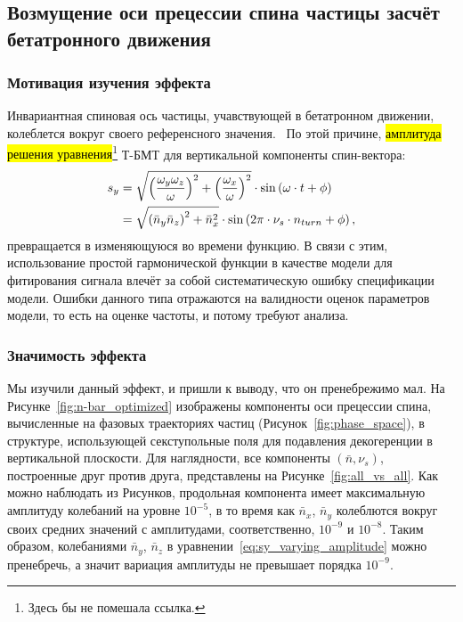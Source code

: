 \subsection{Возмущение оси прецессии спина частицы засчёт бетатронного движения}
\subsubsection{Мотивация изучения эффекта}
Инвариантная спиновая ось частицы, учавствующей в бетатронном движении, колеблется вокруг своего референсного значения.~\cite[стр.~11]{Shatunov} По этой причине, \hl{амплитуда решения уравнения}\footnote{Здесь бы не помешала ссылка.} Т-БМТ для вертикальной компоненты спин-вектора:
\begin{align}
s_y &= \sqrt{\bkt{\frac{\w_y\w_z}{\w}}^2 + \bkt{\frac{\w_x}{\w}}^2}\cdot\sin\bkt{\w\cdot t + \phi}\notag\\
&= \sqrt{\bkt{\bar n_y\bar n_z}^2 + \bar n_x^2} \cdot \sin\bkt{2\pi\cdot\nu_s\cdot n_{turn} + \phi},\label{eq:sy_varying_amplitude}
\end{align}
превращается в изменяющуюся во времени функцию. В связи с этим, использование простой гармонической функции в качестве модели для фитирования сигнала влечёт за собой систематическую ошибку спецификации модели. Ошибки данного типа отражаются на валидности оценок параметров модели, то есть на оценке частоты, и потому требуют анализа.

\subsubsection{Значимость эффекта}
Мы изучили данный эффект, и пришли к выводу, что он пренебрежимо мал. На Рисунке~\ref{fig:n-bar_optimized} изображены компоненты оси прецессии спина, вычисленные на фазовых траекториях частиц (Рисунок~\ref{fig:phase_space}), в структуре, использующей секступольные поля для подавления декогеренции в вертикальной плоскости. Для наглядности, все компоненты $(\bar n, \nu_s)$, построенные друг против друга, представлены на Рисунке~\ref{fig:all_vs_all}. Как можно наблюдать из Рисунков, продольная компонента имеет максимальную амплитуду колебаний на уровне $10^{-5}$, в то время как $\bar n_x$, $\bar n_y$ колеблются вокруг своих средних значений с амплитудами, соответственно, $10^{-9}$ и $10^{-8}$. Таким образом, колебаниями $\bar n_y$, $\bar n_z$ в уравнении~\eqref{eq:sy_varying_amplitude} можно пренебречь, а значит вариация амплитуды не превышает порядка $10^{-9}$.

